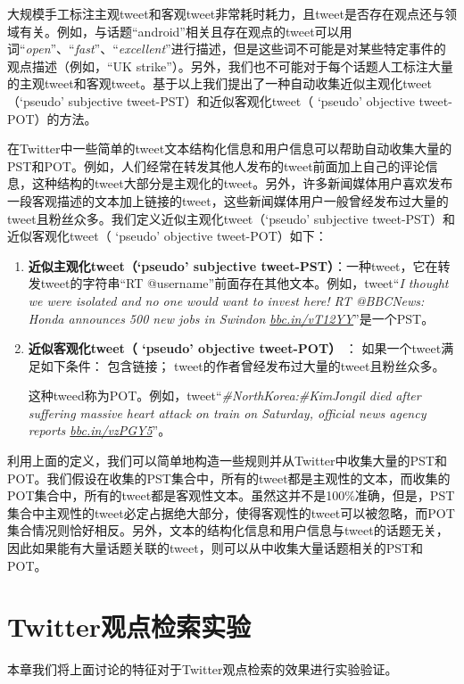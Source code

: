 大规模手工标注主观tweet和客观tweet非常耗时耗力，且tweet是否存在观点还与领域有关。例如，与话题“android”相关且存在观点的tweet可以用词“\emph{open}”、“\emph{fast}”、“\emph{excellent}”进行描述，但是这些词不可能是对某些特定事件的观点描述（例如，“UK strike”）。另外，我们也不可能对于每个话题人工标注大量的主观tweet和客观tweet。基于以上我们提出了一种自动收集近似主观化tweet（`pseudo' subjective tweet-PST）和近似客观化tweet（ `pseudo' objective tweet-POT）的方法。

在Twitter中一些简单的tweet文本结构化信息和用户信息可以帮助自动收集大量的PST和POT。例如，人们经常在转发其他人发布的tweet前面加上自己的评论信息，这种结构的tweet大部分是主观化的tweet。另外，许多新闻媒体用户喜欢发布一段客观描述的文本加上链接的tweet，这些新闻媒体用户一般曾经发布过大量的tweet且粉丝众多。我们定义近似主观化tweet（`pseudo' subjective tweet-PST）和近似客观化tweet（ `pseudo' objective tweet-POT）如下：

 \begin{enumerate}
\item{ \textbf{近似主观化tweet（`pseudo' subjective tweet-PST）}}：一种tweet，它在转发tweet的字符串“RT @username”前面存在其他文本。例如，tweet“\emph{I thought we were isolated and no one would want to  invest here! RT @BBCNews: Honda announces 500 new jobs in Swindon \url{bbc.in/vT12YY}}”是一个PST。
\item{\textbf{近似客观化tweet（ `pseudo' objective tweet-POT）}} ： 如果一个tweet满足如下条件：
包含链接；
tweet的作者曾经发布过大量的tweet且粉丝众多。

这种tweed称为POT。例如，tweet“\emph{\#NorthKorea:\#KimJongil died after suffering massive heart attack on train on Saturday, official news agency reports \url{bbc.in/vzPGY5}}”。
\end{enumerate}

利用上面的定义，我们可以简单地构造一些规则并从Twitter中收集大量的PST和POT。我们假设在收集的PST集合中，所有的tweet都是主观性的文本，而收集的POT集合中，所有的tweet都是客观性文本。虽然这并不是100\%准确，但是，PST集合中主观性的tweet必定占据绝大部分，使得客观性的tweet可以被忽略，而POT集合情况则恰好相反。另外，文本的结构化信息和用户信息与tweet的话题无关，因此如果能有大量话题关联的tweet，则可以从中收集大量话题相关的PST和POT。

\section{Twitter观点检索实验}
本章我们将上面讨论的特征对于Twitter观点检索的效果进行实验验证。

